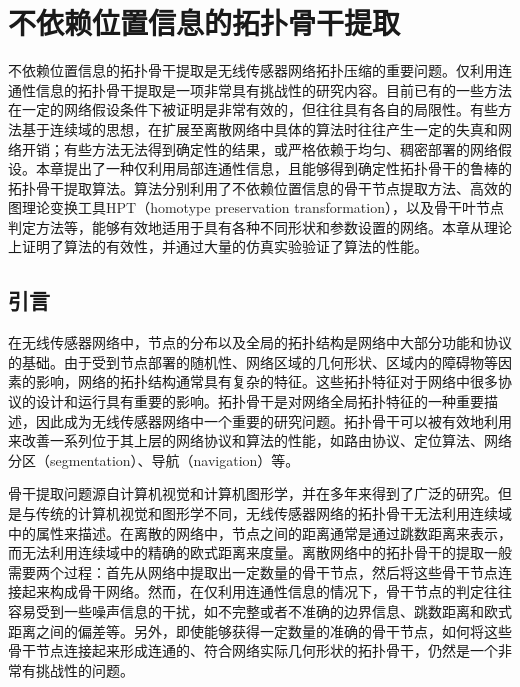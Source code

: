 \chapter{不依赖位置信息的拓扑骨干提取}
\label{chap:3}
不依赖位置信息的拓扑骨干提取是无线传感器网络拓扑压缩的重要问题。仅利用连通性信息的拓扑骨干提取是一项非常具有挑战性的研究内容。目前已有的一些方法在一定的网络假设条件下被证明是非常有效的，但往往具有各自的局限性。有些方法基于连续域的思想，在扩展至离散网络中具体的算法时往往产生一定的失真和网络开销；有些方法无法得到确定性的结果，或严格依赖于均匀、稠密部署的网络假设。本章提出了一种仅利用局部连通性信息，且能够得到确定性拓扑骨干的鲁棒的拓扑骨干提取算法。算法分别利用了不依赖位置信息的骨干节点提取方法、高效的图理论变换工具HPT（homotype preservation transformation），以及骨干叶节点判定方法等，能够有效地适用于具有各种不同形状和参数设置的网络。本章从理论上证明了算法的有效性，并通过大量的仿真实验验证了算法的性能。
\section{引言}
在无线传感器网络中，节点的分布以及全局的拓扑结构是网络中大部分功能和协议的基础。由于受到节点部署的随机性、网络区域的几何形状、区域内的障碍物等因素的影响，网络的拓扑结构通常具有复杂的特征。这些拓扑特征对于网络中很多协议的设计和运行具有重要的影响。拓扑骨干是对网络全局拓扑特征的一种重要描述，因此成为无线传感器网络中一个重要的研究问题。拓扑骨干可以被有效地利用来改善一系列位于其上层的网络协议和算法的性能，如路由协议、定位算法、网络分区（segmentation）、导航（navigation）等。

骨干提取问题源自计算机视觉和计算机图形学，并在多年来得到了广泛的研究。但是与传统的计算机视觉和图形学不同，无线传感器网络的拓扑骨干无法利用连续域中的属性来描述。在离散的网络中，节点之间的距离通常是通过跳数距离来表示，而无法利用连续域中的精确的欧式距离来度量。离散网络中的拓扑骨干的提取一般需要两个过程：首先从网络中提取出一定数量的骨干节点，然后将这些骨干节点连接起来构成骨干网络。然而，在仅利用连通性信息的情况下，骨干节点的判定往往容易受到一些噪声信息的干扰，如不完整或者不准确的边界信息、跳数距离和欧式距离之间的偏差等。另外，即使能够获得一定数量的准确的骨干节点，如何将这些骨干节点连接起来形成连通的、符合网络实际几何形状的拓扑骨干，仍然是一个非常有挑战性的问题。

